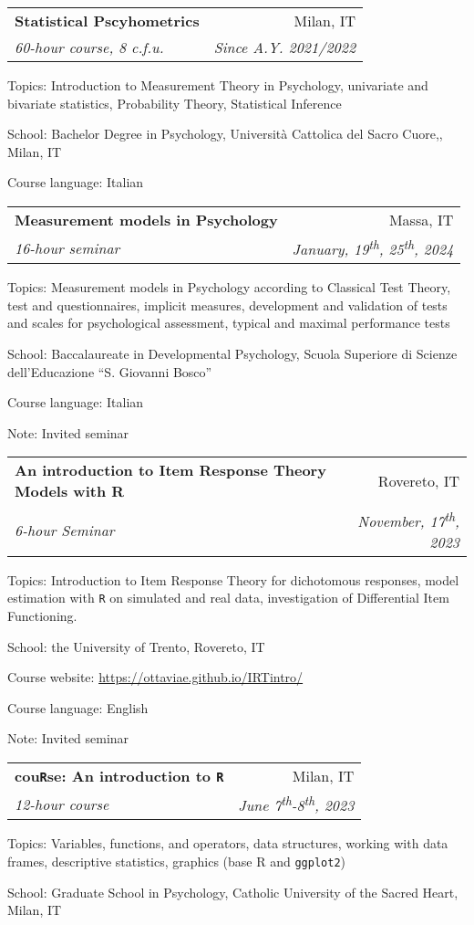\documentclass[letterpaper,12pt]{article}
\makeatletter
\newcommand{\resumeSubheading}[4]{
  \vspace{-1pt}\item
    \begin{tabular*}{0.97\textwidth}{l@{\extracolsep{\fill}}r}
      \textbf{#1} & #2 \\
      \textit{\small#3} & \textit{\small #4} \\
    \end{tabular*}\vspace{-5pt}
}
\makeatother
\begin{document}
\resumeSubheading {Statistical Pscyhometrics}{Milan, IT}{60-hour course, 8 c.f.u.}{\small{Since A.Y. 2021/2022}}

{\small Topics: Introduction to Measurement Theory in Psychology, univariate and bivariate statistics, Probability Theory, Statistical Inference}

{\small School: Bachelor Degree in Psychology, Università Cattolica del Sacro Cuore,, Milan, IT} 

{\small Course language: Italian}

\resumeSubheading {Measurement models in Psychology}{Massa, IT}{16-hour seminar}{January, 19\textsuperscript{th}, 25\textsuperscript{th}, 2024}

{\small Topics: Measurement models in Psychology according to Classical Test Theory, test and questionnaires, implicit measures, development and validation of tests and scales for psychological assessment, typical and maximal performance tests}

{\small School: Baccalaureate in Developmental Psychology, Scuola Superiore di Scienze dell'Educazione ``S. Giovanni Bosco''}

{\small Course language: Italian}

{\small Note: Invited seminar}

\resumeSubheading {An introduction to Item Response Theory Models with R}{Rovereto, IT}{6-hour Seminar}{November, 17\textsuperscript{th}, 2023}

{\small Topics: Introduction to Item Response Theory for dichotomous responses, model estimation with \texttt{R} on simulated and real data, investigation of Differential Item Functioning. }

{\small School: the University of Trento, Rovereto, IT} 


{\small Course website:  \href{https://ottaviae.github.io/IRTintro/}{https://ottaviae.github.io/IRTintro/}} 

{\small Course language: English}

{\small Note: Invited seminar}

\resumeSubheading {cou\texttt{R}se: An introduction to \texttt{R}}{Milan, IT}{12-hour course}{\small{June 7\textsuperscript{th}-8\textsuperscript{th}, 2023}}

{\small Topics: Variables, functions, and operators, data structures, working with data frames, descriptive statistics, graphics (base R and \texttt{ggplot2})}

{\small School: Graduate School in Psychology, Catholic University of the Sacred Heart, Milan,  IT} 
\end{document}
